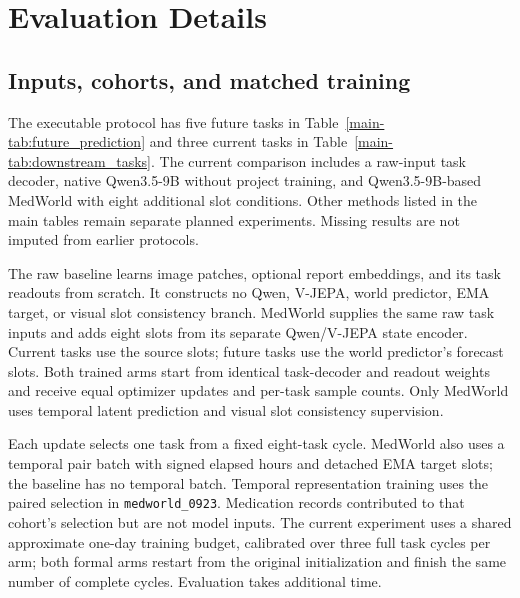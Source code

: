 \section{Evaluation Details}
\label{app:protocol}

\subsection{Inputs, cohorts, and matched training}

The executable protocol has five future tasks in
Table~\ref{main-tab:future_prediction} and three current tasks in
Table~\ref{main-tab:downstream_tasks}. The current comparison includes a
raw-input task decoder, native Qwen3.5-9B without project training, and
Qwen3.5-9B-based MedWorld with eight additional slot conditions. Other methods
listed in the main tables remain separate planned experiments. Missing results
are not imputed from earlier protocols.

The raw baseline learns image patches, optional report embeddings, and its task
readouts from scratch. It constructs no Qwen, V-JEPA, world predictor, EMA target,
or visual slot consistency branch. MedWorld supplies the same raw task inputs
and adds eight slots from its separate Qwen/V-JEPA state encoder. Current tasks
use the source slots; future tasks use the world predictor's forecast slots.
Both trained arms start from identical task-decoder and readout weights and
receive equal optimizer updates and per-task sample counts. Only MedWorld uses
temporal latent prediction and visual slot consistency supervision.

Each update selects one task from a fixed eight-task cycle. MedWorld also uses a
temporal pair batch with signed elapsed hours and detached EMA target slots;
the baseline has no temporal batch. Temporal representation training uses the
paired selection in \texttt{medworld\_0923}. Medication records contributed to
that cohort's selection but are not model inputs. The current experiment uses
a shared approximate one-day training budget, calibrated over three full task
cycles per arm; both formal arms restart from the original initialization and
finish the same number of complete cycles. Evaluation takes additional time.

